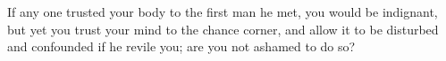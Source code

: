 If any one trusted  your body to the first man he met,  you would be indignant,
but yet you trust your mind to the  chance corner, and allow it to be disturbed
and confounded if he revile you; are you not ashamed to do so?
